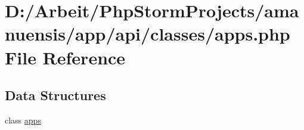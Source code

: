 \hypertarget{apps_8php}{}\section{D\+:/\+Arbeit/\+Php\+Storm\+Projects/amanuensis/app/api/classes/apps.php File Reference}
\label{apps_8php}
\subsection*{Data Structures}
\begin{DoxyCompactItemize}
\item 
class \hyperlink{classapps}{apps}
\end{DoxyCompactItemize}
